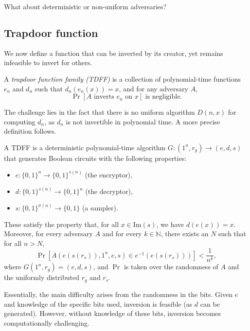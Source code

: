 \begin{exercise}
    What about deterministic or non-uniform adversaries?
\end{exercise}

\subsection{Trapdoor function}

We now define a function that can be inverted by its creator, yet remains infeasible to invert for others.

\begin{definition}
    A \emph{trapdoor function family (TDFF)} is a collection of polynomial-time functions $e_n$ and $d_n$ such that $d_n(e_n(x)) = x$, and for any adversary $A$,
    \[
        \Pr[A \text{ inverts } e_n \text{ on } x] \text{ is negligible}.
    \]
\end{definition}

The challenge lies in the fact that there is no uniform algorithm $D(n, x)$ for computing $d_n$, as $d_n$ is not invertible in polynomial time. A more precise definition follows.

\begin{definition}
    A TDFF is a deterministic polynomial-time algorithm $G \colon (1^n, r_g) \to (e, d, s)$ that generates Boolean circuits with the following properties:
    \begin{itemize}
        \item $e \colon \{0, 1\}^n \to \{0, 1\}^{s(n)}$ (the encryptor),
        \item $d \colon \{0, 1\}^{s(n)} \to \{0, 1\}^n$ (the decryptor),
        \item $s \colon \{0, 1\}^{\sigma(n)} \to \{0, 1\}$ (a sampler).
    \end{itemize}
    These satisfy the property that, for all $x \in \text{Im}(s)$, we have $d(e(x)) = x$. Moreover, for every adversary $A$ and for every $k \in \mathbb{N}$, there exists an $N$ such that for all $n > N$,
    \[
        \Pr[A(e(s(r_s)), 1^n, e, s) \in e^{-1}(e(s(r_s)))] < \frac{1}{n^k},
    \]
    where $G(1^n, r_g) = (e, d, s)$, and $\Pr$ is taken over the randomness of $A$ and the uniformly distributed $r_g$ and $r_s$.
\end{definition}

Essentially, the main difficulty arises from the randomness in the bits.
Given $e$ and knowledge of the specific bits used, inversion is feasible (as $d$ can be generated).
However, without knowledge of these bits, inversion becomes computationally challenging.

